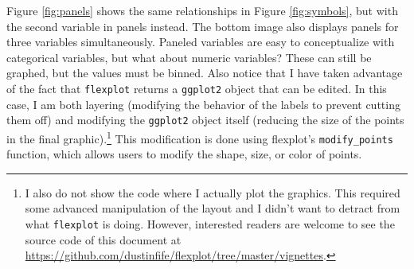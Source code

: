 \documentclass[
  man]{apa6}
\begin{document}
Figure \ref{fig:panels} shows the same relationships in Figure \ref{fig:symbols}, but with the second variable in panels instead. The bottom image also displays panels for three variables simultaneously. Paneled variables are easy to conceptualize with categorical variables, but what about numeric variables? These can still be graphed, but the values must be binned. Also notice that I have taken advantage of the fact that \texttt{flexplot} returns a \texttt{ggplot2} object that can be edited. In this case, I am both layering (modifying the behavior of the labels to prevent cutting them off) and modifying the \texttt{ggplot2} object itself (reducing the size of the points in the final graphic).\footnote{I also do not show the code where I actually plot the graphics. This required some advanced manipulation of the layout and I didn't want to detract from what \texttt{flexplot} is doing. However, interested readers are welcome to see the source code of this document at \url{https://github.com/dustinfife/flexplot/tree/master/vignettes}.} This modification is done using flexplot's \texttt{modify\_points} function, which allows users to modify the shape, size, or color of points.

\small
\end{document}

